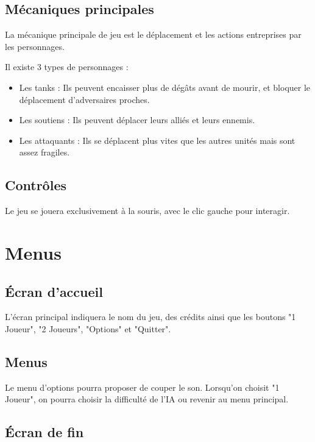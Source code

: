\documentclass[a4paper]{scrreprt}
\begin{document}
\section{Mécaniques principales}

La mécanique principale de jeu est le déplacement et les actions entreprises par les personnages.

Il existe 3 types de personnages :
\begin{itemize}
    \item Les tanks : Ils peuvent encaisser plus de dégâts avant de mourir, et bloquer le déplacement d'adversaires proches.
    \item Les soutiens : Ils peuvent déplacer leurs alliés et leurs ennemis.
    \item Les attaquants : Ils se déplacent plus vites que les autres unités mais sont assez fragiles.
\end{itemize}

\section{Contrôles}
Le jeu se jouera exclusivement à la souris, avec le clic gauche pour interagir.



\chapter{Menus}

\section{\'Ecran d'accueil}

L'écran principal indiquera le nom du jeu, des crédits ainsi que les boutons "1 Joueur", "2 Joueurs", "Options" et "Quitter".

\section{Menus}

Le menu d'options pourra proposer de couper le son.
Lorsqu'on choisit "1 Joueur", on pourra choisir la difficulté de l'IA ou revenir au menu principal.

\section{\'Ecran de fin}
\end{document}

